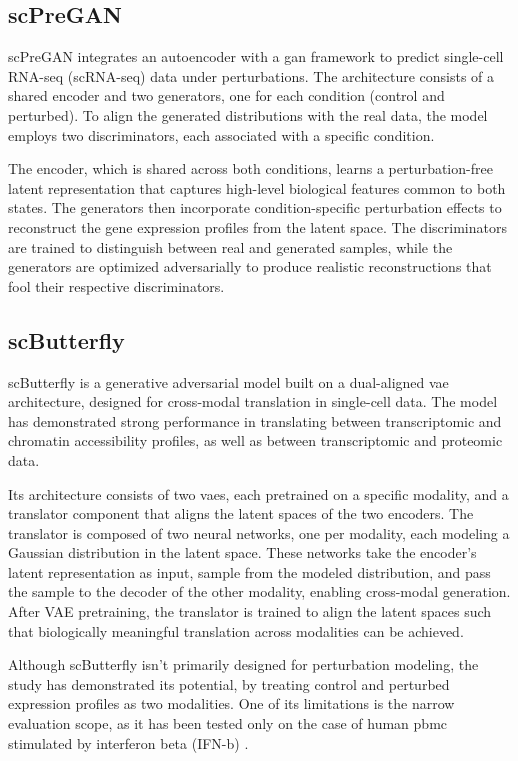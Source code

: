 \documentclass[12pt, a4paper]{article}
\begin{document}
\subsection{scPreGAN}

scPreGAN integrates an autoencoder with a \gls{gan} framework to predict single-cell RNA-seq (scRNA-seq) data under perturbations. The architecture consists of a shared encoder and two generators, one for each condition (control and perturbed). To align the generated distributions with the real data, the model employs two discriminators, each associated with a specific condition.

The encoder, which is shared across both conditions, learns a perturbation-free latent representation that captures high-level biological features common to both states. The generators then incorporate condition-specific perturbation effects to reconstruct the gene expression profiles from the latent space. The discriminators are trained to distinguish between real and generated samples, while the generators are optimized adversarially to produce realistic reconstructions that fool their respective discriminators.


\subsection{scButterfly}


scButterfly is a generative adversarial model built on a dual-aligned \gls{vae} architecture, designed for cross-modal translation in single-cell data. The model has demonstrated strong performance in translating between transcriptomic and chromatin accessibility profiles, as well as between transcriptomic and proteomic data.

Its architecture consists of two \gls{vae}s, each pretrained on a specific modality, and a translator component that aligns the latent spaces of the two encoders. The translator is composed of two neural networks, one per modality, each modeling a Gaussian distribution in the latent space. These networks take the encoder's latent representation as input, sample from the modeled distribution, and pass the sample to the decoder of the other modality, enabling cross-modal generation.
After VAE pretraining, the translator is trained to align the latent spaces such that biologically meaningful translation across modalities can be achieved.

Although scButterfly isn't primarily designed for perturbation modeling, the study has demonstrated its potential, by treating control and perturbed expression profiles as two modalities. One of its limitations is the narrow evaluation scope, as it has been tested only on the case of human \gls{pbmc} stimulated by interferon beta (IFN-b) \cite{kanaGenerativeModelingSinglecell2023}.
\end{document}
